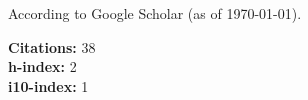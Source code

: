 \newif\ifshowpubsummary
\showpubsummarytrue %

\newif\ifshowsubmittedpubs

\newif\ifshowacceptedpubs

\nocite{*}
\ifshowpubsummary
    \begin{minipage}[t]{0.6\textwidth}
        According to Google Scholar (as of \today).
    \end{minipage}%
    \begin{minipage}[t]{0.4\textwidth}
        \begin{flushright}
            \textbf{Citations:} 38\\
            \textbf{h-index:} 2\\
            \textbf{i10-index:} 1
        \end{flushright}
    \end{minipage}

\else %
\fi

\ifshowsubmittedpubs
    \subsectiontitle{Submitted Publications}
    \printbibliography[keyword=submitted, heading=none]
\else %
\fi

\ifshowacceptedpubs
    \subsectiontitle{Accepted Publications}
    \printbibliography[keyword=accepted, heading=none]
\else %
\fi

\printbibliography[keyword=refereed, heading=none]
